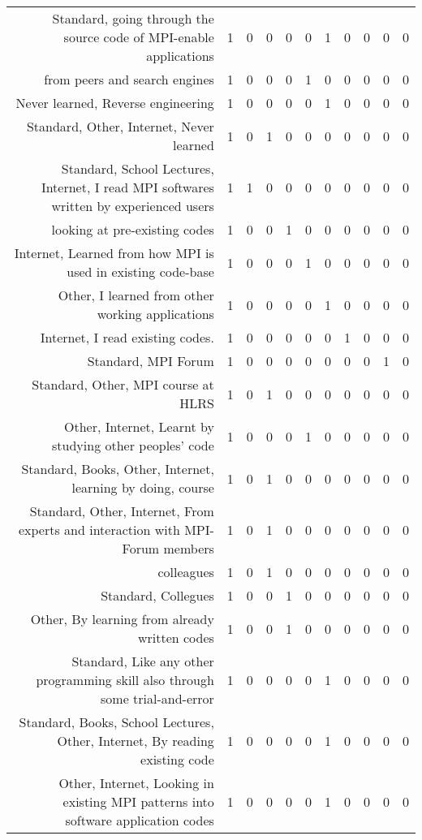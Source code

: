 {\begin{landscape}
\begin{longtable}[htb]{r|c|c|c|c|c|c|c|c|c|c}
{Standard, going through the source code of MPI-enable applications} & 1 & 0 & 0 & 0 & 0 & 1 & 0 & 0 & 0 & 0 \\%
{from peers and search engines} & 1 & 0 & 0 & 0 & 1 & 0 & 0 & 0 & 0 & 0 \\%
{Never learned, Reverse engineering} & 1 & 0 & 0 & 0 & 0 & 1 & 0 & 0 & 0 & 0 \\%
{Standard, Other, Internet, Never learned} & 1 & 0 & 1 & 0 & 0 & 0 & 0 & 0 & 0 & 0 \\%
{Standard, School Lectures, Internet, I read MPI softwares written by experienced users} & 1 & 1 & 0 & 0 & 0 & 0 & 0 & 0 & 0 & 0 \\%
{looking at pre-existing codes} & 1 & 0 & 0 & 1 & 0 & 0 & 0 & 0 & 0 & 0 \\%
{Internet, Learned from how MPI is used in existing code-base} & 1 & 0 & 0 & 0 & 1 & 0 & 0 & 0 & 0 & 0 \\%
{Other, I learned from other working applications} & 1 & 0 & 0 & 0 & 0 & 1 & 0 & 0 & 0 & 0 \\%
{Internet, I read existing codes.} & 1 & 0 & 0 & 0 & 0 & 0 & 1 & 0 & 0 & 0 \\%
{Standard, MPI Forum} & 1 & 0 & 0 & 0 & 0 & 0 & 0 & 0 & 1 & 0 \\%
{Standard, Other, MPI course at HLRS} & 1 & 0 & 1 & 0 & 0 & 0 & 0 & 0 & 0 & 0 \\%
{Other, Internet, Learnt by studying other peoples' code} & 1 & 0 & 0 & 0 & 1 & 0 & 0 & 0 & 0 & 0 \\%
{Standard, Books, Other, Internet, learning by doing, course} & 1 & 0 & 1 & 0 & 0 & 0 & 0 & 0 & 0 & 0 \\%
{Standard, Other, Internet, From experts and interaction with MPI-Forum members} & 1 & 0 & 1 & 0 & 0 & 0 & 0 & 0 & 0 & 0 \\%
{colleagues} & 1 & 0 & 1 & 0 & 0 & 0 & 0 & 0 & 0 & 0 \\%
{Standard, Collegues} & 1 & 0 & 0 & 1 & 0 & 0 & 0 & 0 & 0 & 0 \\%
{Other, By learning from already written codes} & 1 & 0 & 0 & 1 & 0 & 0 & 0 & 0 & 0 & 0 \\%
{Standard, Like any other programming skill also through some trial-and-error} & 1 & 0 & 0 & 0 & 0 & 1 & 0 & 0 & 0 & 0 \\%
{Standard, Books, School Lectures, Other, Internet, By reading existing code} & 1 & 0 & 0 & 0 & 0 & 1 & 0 & 0 & 0 & 0 \\%
{Other, Internet, Looking in existing MPI patterns into software application codes} & 1 & 0 & 0 & 0 & 0 & 1 & 0 & 0 & 0 & 0 \\%

\end{longtable}
\end{landscape}}
